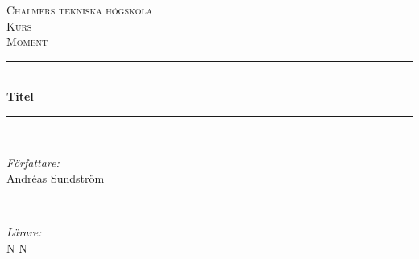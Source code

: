 \renewcommand{\thefootnote}{\fnsymbol{footnote}}

\newcommand{\andsunds}{andsunds@student.chalmers.se}




\begin{titlepage}

\newcommand{\HRule}{\rule{\linewidth}{0.5mm}} %

\center %
 

\textsc{\huge Chalmers tekniska högskola}\\[1.5cm] %
\textsc{\Large Kurs}\\[0.2cm] %
\textsc{\large Moment }\\[0.5cm] %


\HRule \\[0.4cm]
{ \LARGE \bfseries 
Titel
}\\[0.4cm] %
\HRule \\[1.5cm]
 

\begin{minipage}{0.4\textwidth}
\begin{flushleft} \large
\emph{Författare:}\\
Andréas Sundström\footnotemark{}
\end{flushleft}
\end{minipage}
~
\begin{minipage}{0.4\textwidth}
\begin{flushright} \large
\emph{Lärare:} \\
N N
\end{flushright}
\end{minipage}\\[3cm]


\end{titlepage}

